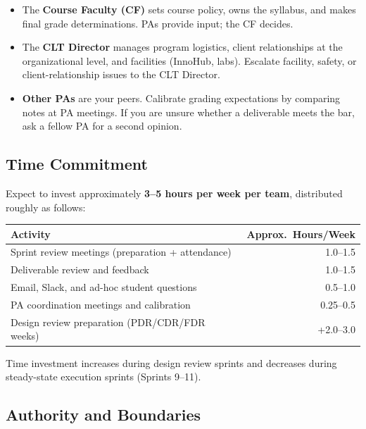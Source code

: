 \begin{itemize}[nosep,leftmargin=1.5em]
\item The \textbf{Course Faculty (CF)} sets course policy, owns the syllabus, and makes final grade determinations. PAs provide input; the CF decides.
\item The \textbf{CLT Director} manages program logistics, client relationships at the organizational level, and facilities (InnoHub, labs). Escalate facility, safety, or client-relationship issues to the CLT Director.
\item \textbf{Other PAs} are your peers. Calibrate grading expectations by comparing notes at PA meetings. If you are unsure whether a deliverable meets the bar, ask a fellow PA for a second opinion.
\end{itemize}

\subsection{Time Commitment}

Expect to invest approximately \textbf{3--5 hours per week per team}, distributed roughly as follows:

{\centering\small
\begin{tabularx}{\textwidth}{Xr}
\toprule
\textbf{Activity} & \textbf{Approx.\ Hours/Week} \\
\midrule
Sprint review meetings (preparation + attendance) & 1.0--1.5 \\
Deliverable review and feedback & 1.0--1.5 \\
Email, Slack, and ad-hoc student questions & 0.5--1.0 \\
PA coordination meetings and calibration & 0.25--0.5 \\
Design review preparation (PDR/CDR/FDR weeks) & +2.0--3.0 \\
\bottomrule
\end{tabularx}
\par}

\vspace{4pt}
Time investment increases during design review sprints and decreases during steady-state execution sprints (Sprints 9--11).

\subsection{Authority and Boundaries}

